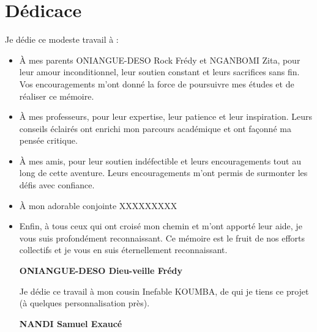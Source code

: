 \chapter*{Dédicace}
Je dédie ce modeste travail à : \\
\begin{itemize}
  \item {
    À mes parents ONIANGUE-DESO Rock Frédy et NGANBOMI Zita, pour leur amour
    inconditionnel, leur soutien constant et leurs sacrifices sans fin. Vos
    encouragements m’ont donné la force de poursuivre mes études et de réaliser ce mémoire.
  }
\item {
    À mes professeurs, pour leur expertise, leur patience et leur inspiration.
    Leurs conseils éclairés ont enrichi mon parcours académique et ont façonné ma pensée critique.

  }
\item {
    À mes amis, pour leur soutien indéfectible et leurs encouragements tout au
    long de cette aventure. Leurs encouragements m’ont permis de surmonter les défis avec confiance.

  }

\item {
    À mon adorable conjointe XXXXXXXXX

  }

  \item {
    Enfin, à tous ceux qui ont croisé mon chemin et m’ont apporté leur aide, je vous suis profondément reconnaissant. Ce mémoire est le fruit de nos efforts collectifs et je vous en suis éternellement reconnaissant.
  }

  \vspace{0.2cm}
  \begin{flushright}
    \large {
      \textbf {
        ONIANGUE-DESO Dieu-veille Frédy
      }
    }
  \end{flushright}

  \vspace{1.5cm}

  Je dédie ce travail à mon cousin  Inefable KOUMBA, de qui je tiens ce 	projet (à quelques personnalisation près).
  \vspace{0.2cm}
  \begin{flushright}
    \large {
      \textbf {
        NANDI Samuel Exaucé
    }
    }
  \end{flushright}

\end{itemize}
